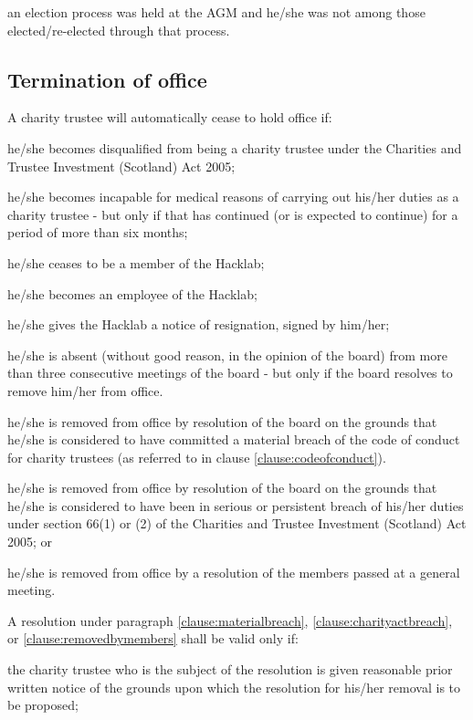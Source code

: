 \documentclass{article}
\newcommand{\charityact}{Charities and Trustee Investment (Scotland) Act 2005}
\begin{document}
\subclause an election process was held at the AGM and he/she was not
among those elected/re-elected through that process.

\subsection{Termination of office}

\clause A charity trustee will automatically cease to hold office if:

\subclause he/she becomes disqualified from being a charity trustee
under the \charityact;

\subclause he/she becomes incapable for medical reasons of carrying
out his/her duties as a charity trustee - but only if that has
continued (or is expected to continue) for a period of more than six
months;

\subclause he/she ceases to be a member of the Hacklab;

\subclause he/she becomes an employee of the Hacklab;

\subclause he/she gives the Hacklab a notice of resignation, signed by
him/her;

\subclause he/she is absent (without good reason, in the opinion of
the board) from more than three consecutive meetings of the board -
but only if the board resolves to remove him/her from office.

\subclause\label{clause:materialbreach}he/she is removed from office by resolution of the board on
the grounds that he/she is considered to have committed a material
breach of the code of conduct for charity trustees (as referred to in
clause \ref{clause:codeofconduct}).

\subclause\label{clause:charityactbreach}he/she is removed from office
by resolution of the board on the grounds that he/she is considered to
have been in serious or persistent breach of his/her duties under
section 66(1) or (2) of the \charityact; or

\subclause\label{clause:removedbymembers}he/she is removed from office by a resolution of the
members passed at a general meeting.

\clause A resolution under paragraph \ref{clause:materialbreach},
\ref{clause:charityactbreach}, or \ref{clause:removedbymembers} shall
be valid only if:

\subclause the charity trustee who is the subject of the resolution is
given reasonable prior written notice of the grounds upon which the
resolution for his/her removal is to be proposed;
\end{document}
